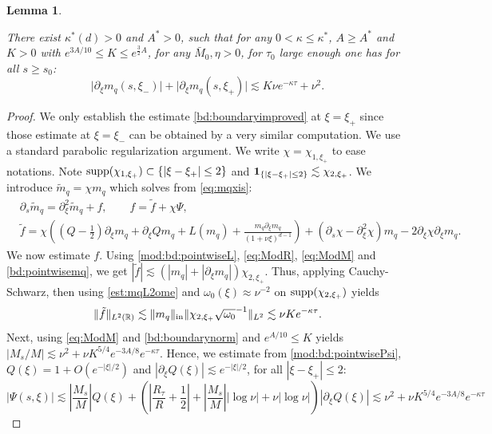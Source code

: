 \documentclass[11pt]{aims}
\newtheorem{lemma}[theorem]{Lemma}
\theoremstyle{definition}
\newcommand{\pa}{\partial}
\newcommand{\inn}{\textup{in}}
\newcommand{\be}{\begin{equation}}
\newcommand{\ee}{\end{equation}}
\numberwithin{equation}{section}
\begin{document}
\begin{lemma} \label{lem:rightboundary}

There exist $\kappa^*(d)>0$ and $A^*>0$, such that for any $0<\kappa\leq\kappa^*$, $A\geq A^*$ and $K>0$ with $e^{3A/10}\leq K\leq e^{\frac 32 A}$, for any $\bar M_0,\eta>0$, for $\tau_0$ large enough one has for all $s\geq s_0$:
\begin{equation} \label{bd:boundaryimproved}
\big|\pa_\xi m_q(s, \xi_-)\big|+\big|\pa_\xi m_q(s, \xi_+)\big| \lesssim  K \nu e^{-\kappa \tau}+\nu^2.
\end{equation}

\end{lemma}


\begin{proof}

We only establish the estimate \eqref{bd:boundaryimproved} at $\xi=\xi_+$ since those estimate at $\xi=\xi_-$ can be obtained by a very similar computation. We use a standard parabolic regularization argument. We write $\chi=\chi_{1,\xi_+}$ to ease notations. Note $\textup{supp} (\chi_{1,\xi_+})\subset \{ | \xi-\xi_+|\leq 2\}$ and ${\bf 1}_{ \{ | \xi-\xi_+|\leq 2\}}\lesssim \chi_{2,\xi_+}$. We introduce $\tilde m_q=\chi m_q$ which solves from \eqref{eq:mqxis}:
\begin{align}
\label{boundary:id:evo} &\pa_s \tilde m_q=\pa_{\xi}^2 \tilde m_q+f, \qquad f=\tilde f+\chi \Psi, \\
\nonumber &\tilde f=\chi\left((Q-\frac 12)\pa_\xi m_q+\pa_\xi Q m_q+L(m_q)+\frac{m_q\pa_\xi m_q}{(1+\nu \xi)^{d-1}}\right)+(\pa_s \chi-\pa_\xi^2\chi)m_q-2\pa_\xi \chi \pa_\xi m_q.
\end{align}
We now estimate $f$. Using \eqref{mod:bd:pointwiseL}, \eqref{eq:ModR}, \eqref{eq:ModM} and \eqref{bd:pointwisemq}, we get $|\tilde f|\lesssim (|m_q|+|\pa_\xi m_q|)\chi_{2,\xi_+}$. Thus, applying Cauchy-Schwarz, then using \eqref{est:mqL2ome} and $\omega_0(\xi)\approx \nu^{-2}$ on $\textup{supp} (\chi_{2,\xi_+})$ yields
\be  \label{boundary:bd:inter3}
\| \tilde f\|_{L^2(\mathbb R)}\lesssim \| m_q\|_{\inn}\|\chi_{2,\xi_+} \sqrt{\omega_0}^{-1}\|_{L^2}\lesssim \nu K e^{-\kappa \tau}.
\ee
Next, using \eqref{eq:ModM} and \eqref{bd:boundarynorm} and $e^{A/10}\leq K$ yields $|M_s/M|\lesssim \nu^2+\nu K^{5/4}e^{-3A/8}e^{-\kappa \tau}$. Hence, we estimate from \eqref{mod:bd:pointwisePsi}, $Q(\xi)=1+O(e^{-|\xi|/2})$ and $|\pa_\xi Q(\xi)|\lesssim e^{-|\xi|/2}$, for all $|\xi-\xi_+|\leq 2$:
$$
|\Psi (s,\xi)|\lesssim |\frac{M_s}{M}|Q(\xi)+\left(|\frac{R_\tau}{R}+\frac 12|+|\frac{M_s}{M}||\log \nu|+\nu|\log \nu| \right)|\pa_\xi Q(\xi)|\lesssim \nu^2+\nu K^{5/4}e^{-3A/8}e^{-\kappa \tau}
$$
\end{proof}
\end{document}
